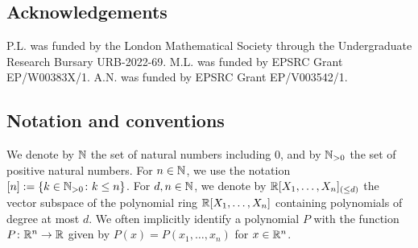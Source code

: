 \subsection{Acknowledgements} P.L. was funded by the London Mathematical Society through the Undergraduate Research Bursary URB-2022-69. M.L. was funded by EPSRC Grant EP/W00383X/1. A.N. was funded by EPSRC Grant EP/V003542/1.

\subsection{Notation and conventions} We denote by $\mathbb{N}$ the set of natural numbers including $0$, and by $\mathbb{N}_{>0}$ the set of positive natural numbers. For $n\in \mathbb{N}$, we use the notation $[n] := \{k\in \mathbb{N}_{>0}\colon k\leq n\}$. For $d,n\in \mathbb{N}$, we denote by $\mathbb{R}[X_1, \ldots, X_n]_{(\le d)}$ the vector subspace of the polynomial ring $\mathbb{R}[X_1,\dots,X_n]$ containing polynomials of degree at most $d$. We often implicitly identify a polynomial $P$ with the function $P\colon \mathbb{R}^n\to \mathbb{R}$ given by $P(x)=P(x_1,\dots,x_n)$ for $x\in \mathbb{R}^n$.
